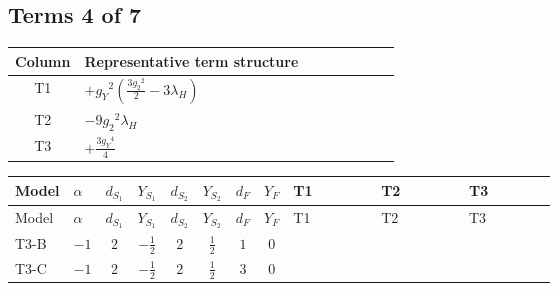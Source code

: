 \documentclass[8pt]{article}
\begin{document}
\begin{landscape}
\subsection*{Terms 4 of 7}
\begin{center}
\begin{tabular}{@{}c >{\raggedright\arraybackslash}p{0.82\linewidth}@{}}
\toprule
Column & Representative term structure \\
\midrule
T1 & \(\displaystyle +{g_Y}^2 \left(\frac{3 {g_2}^2}{2}-3 {\lambda_H}\right)\) \\
\midrule
T2 & \(\displaystyle -9 {g_2}^2 {\lambda_H}\) \\
\midrule
T3 & \(\displaystyle +\frac{3 {g_Y}^4}{4}\) \\
\midrule
\bottomrule
\end{tabular}
\end{center}
\smallskip
\tiny
\begin{longtable}{@{}llcccccc >{\raggedright\arraybackslash}p{0.21\linewidth} >{\raggedright\arraybackslash}p{0.21\linewidth} >{\raggedright\arraybackslash}p{0.21\linewidth}@{}}
\toprule
Model & $\alpha$ & $d_{S_1}$ & $Y_{S_1}$ & $d_{S_2}$ & $Y_{S_2}$ & $d_F$ & $Y_F$ & T1 & T2 & T3 \\
\midrule
\endfirsthead
\toprule
Model & $\alpha$ & $d_{S_1}$ & $Y_{S_1}$ & $d_{S_2}$ & $Y_{S_2}$ & $d_F$ & $Y_F$ & T1 & T2 & T3 \\
\midrule
\endhead
T3-B & $-1$ & $2$ & $-\frac{1}{2}$ & $2$ & $\frac{1}{2}$ & $1$ & $0$ & \scriptsize\adjustbox{max width=\linewidth}{$\begin{gathered} +{g_Y}^2 \left(\frac{3 {g_2}^2}{2}-3 {\lambda_H}\right)\end{gathered}$} & \scriptsize\adjustbox{max width=\linewidth}{$\begin{gathered} -9 {g_2}^2 {\lambda_H}\end{gathered}$} & \scriptsize\adjustbox{max width=\linewidth}{$\begin{gathered} +\frac{3 {g_Y}^4}{4}\end{gathered}$} \\
\midrule
T3-C & $-1$ & $2$ & $-\frac{1}{2}$ & $2$ & $\frac{1}{2}$ & $3$ & $0$ & \scriptsize\adjustbox{max width=\linewidth}{$\begin{gathered} +{g_Y}^2 \left(\frac{3 {g_2}^2}{2}-3 {\lambda_H}\right)\end{gathered}$} & \scriptsize\adjustbox{max width=\linewidth}{$\begin{gathered} -9 {g_2}^2 {\lambda_H}\end{gathered}$} & \scriptsize\adjustbox{max width=\linewidth}{$\begin{gathered} +\frac{3 {g_Y}^4}{4}\end{gathered}$} \\

\end{longtable}
\end{landscape}
\end{document}
